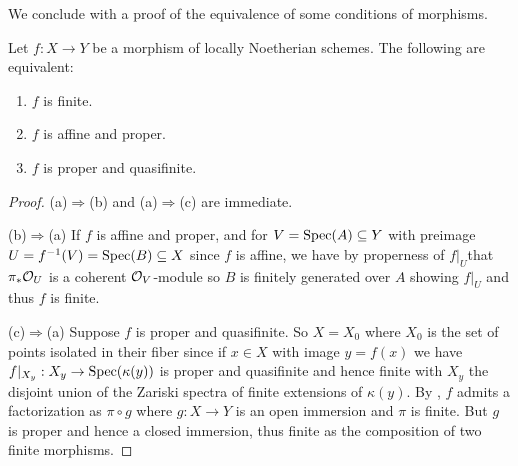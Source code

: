 We conclude with a proof of the equivalence of some conditions of morphisms. 
\begin{corollary}\label{corr: equivalent conditions on morphisms}
    Let $f:X\to Y$ be a morphism of locally Noetherian schemes. The following are equivalent: 
    \begin{enumerate}[label=(\roman*)]
        \item $f$ is finite.
        \item $f$ is affine and proper.
        \item $f$ is proper and quasifinite. 
    \end{enumerate}
\end{corollary}
\begin{proof}
    (a)$\Rightarrow$(b) and (a)$\Rightarrow$(c) are immediate. 
    
    (b)$\Rightarrow$(a) If $f$ is affine and proper, and for $V=\operatorname{Spec}(A)\subseteq Y$ with preimage $U=f^{-1}(V)=\operatorname{Spec}(B)\subseteq X$ since $f$ is affine, we have by properness of $f|_{U}$that $\pi_{*}\mathcal{O}_{U}$ is a coherent $\mathcal{O}_{V}$-module so $B$ is finitely generated over $A$ showing $f|_{U}$ and thus $f$ is finite. 

    (c)$\Rightarrow$(a) Suppose $f$ is proper and quasifinite. So $X=X_{0}$ where $X_{0}$ is the set of points isolated in their fiber since if $x\in X$ with image $y=f(x)$ we have $f|_{X_{y}}:X_{y}\to \operatorname{Spec}(\kappa(y))$ is proper and quasifinite and hence finite with $X_{y}$ the disjoint union of the Zariski spectra of finite extensions of $\kappa(y)$. By , $f$ admits a factorization as $\pi\circ g$ where $g:X\to Y$ is an open immersion and $\pi$ is finite. But $g$ is proper and hence a closed immersion, thus finite as the composition of two finite morphisms. 
\end{proof}